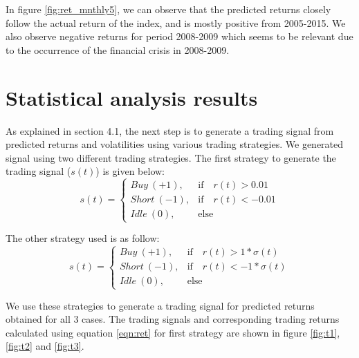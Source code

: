 In figure \ref{fig:ret_mnthly5}, we can observe that the predicted returns closely follow the actual return of the index, and is mostly positive from 2005-2015. We also observe negative returns for period 2008-2009 which seems to be relevant due to the occurrence of the financial crisis in 2008-2009.


\section{Statistical analysis results}
As explained in section 4.1, the next step is to generate a trading signal from predicted returns and volatilities using various trading strategies. We generated signal using two different trading strategies. The first strategy to generate the trading signal ($s(t)$) is given below:
\begin{equation*} \label{eqn:signal}
s(t) = 
\begin{cases}
  Buy\ (+1), & \text{if} \quad r(t) > 0.01 \\
  Short\ (-1), & \text{if} \quad r(t) < -0.01 \\
  Idle\ (0),  & \text{else}
\end{cases}
\end{equation*}

The other strategy used is as follow:
\begin{equation*} \label{eqn:signal}
s(t) = 
\begin{cases}
  Buy\ (+1), & \text{if} \quad r(t) > 1*\sigma(t) \\
  Short\ (-1), & \text{if} \quad r(t) < -1*\sigma(t) \\
  Idle\ (0),  & \text{else}
\end{cases}
\end{equation*}


We use these strategies to generate a trading signal for predicted returns obtained for all 3 cases. The trading signals and corresponding trading returns calculated using equation \ref{eqn:ret} for first strategy are shown in figure \ref{fig:t1}, \ref{fig:t2} and \ref{fig:t3}.

